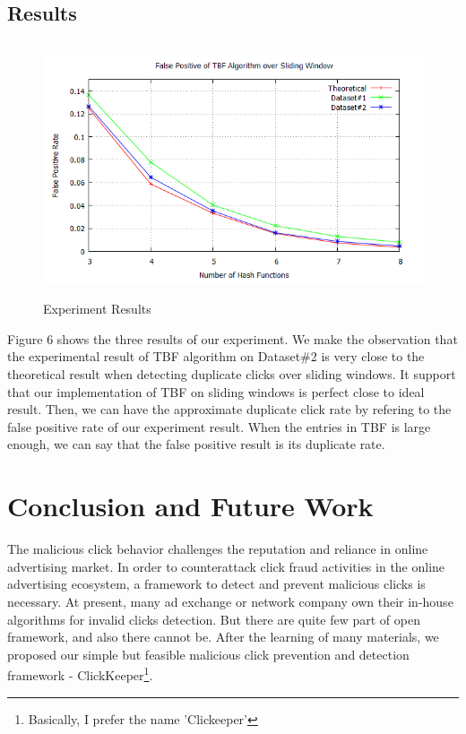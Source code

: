 \documentclass[runningheads,report]{llncs}
\begin{document}
\subsection{Results}

\begin{figure}
\centering
\includegraphics[height=7.5cm]{pic/result}
\caption{Experiment Results}
\label{fig:result}
\end{figure}

Figure 6 shows the three results of our experiment. We make the observation that the experimental result of TBF algorithm on Dataset\#2 is very close to the theoretical result when detecting duplicate clicks over sliding windows. It support that our implementation of TBF on sliding windows is perfect close to ideal result. Then, we can have the approximate duplicate click rate by refering to the false positive rate of our experiment result. When the entries in TBF is large enough, we can say that the false positive result is its duplicate rate.


\section{Conclusion and Future Work}\label{references}

The malicious click behavior challenges the reputation and reliance in online advertising market. 
In order to counterattack click fraud activities in the online advertising ecosystem, a framework to detect and prevent malicious clicks is necessary. At present, many ad exchange or network company own their in-house algorithms for invalid clicks detection. But there are quite few part of open framework, and also there cannot be. After the learning of many materials, we proposed our simple but feasible malicious click prevention and detection framework - ClickKeeper\footnote{Basically, I prefer the name 'Clickeeper'}.
\end{document}
